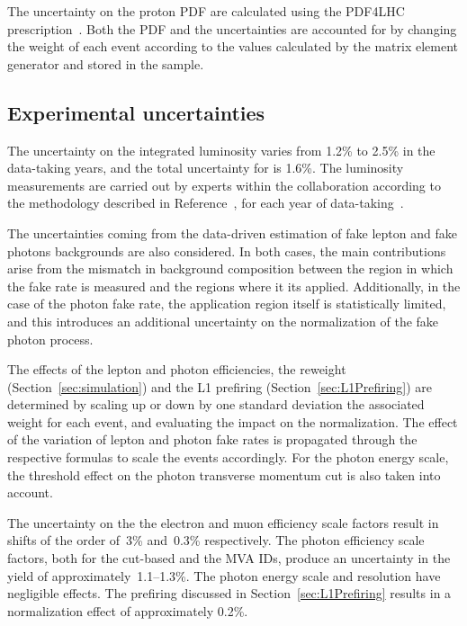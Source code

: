 The uncertainty on the proton PDF are calculated using the PDF4LHC prescription~\cite{Botje:2011sn,Alekhin:2011sk}.
Both the PDF and the \alpS uncertainties are accounted for by changing the
weight of each event according to the values calculated by the matrix element
generator and stored in the sample.

\subsection{Experimental uncertainties}
The uncertainty on the integrated luminosity varies from 1.2\usep\% to 2.5\usep\% in the data-taking years, and the total uncertainty for \RunII{} is 1.6\usep\%.
The luminosity measurements are carried out by experts within the collaboration according to the methodology described in Reference~\cite{CMS-LUM-17-003},
for each year of data-taking~\cite{CMS-LUM-17-004, CMS-LUM-18-002}.


The uncertainties coming from the data-driven estimation of fake lepton and fake photons backgrounds are also considered.
In both cases, the main contributions arise from the mismatch in background composition between the region in which the fake rate is measured and the regions where it its applied.
Additionally, in the case of the photon fake rate, the application region itself is statistically limited, and this introduces an additional uncertainty on the normalization of the fake photon process.

The effects of the lepton and photon efficiencies, the \pileup{} reweight (Section~\ref{sec:simulation})
and the L1 prefiring (Section~\ref{sec:L1Prefiring})
are determined by scaling up or down by one standard deviation the associated weight for each event,
and evaluating the impact on the normalization.
The effect of the variation of lepton and photon fake rates is propagated through the
respective formulas to scale the events accordingly.
For the photon energy scale, the threshold effect on the photon transverse momentum cut
is also taken into account.

The uncertainty on the the electron and muon efficiency scale factors
result in shifts of the order of~3\usep\% and~0.3\usep\% respectively.
The photon efficiency scale factors, both for the cut-based and the MVA IDs,
produce an uncertainty in the yield of approximately~1.1--1.3\usep\%.
The photon energy scale and resolution have negligible effects.
The \Lone prefiring discussed in Section~\ref{sec:L1Prefiring}
results in a normalization effect of approximately 0.2\usep\%.

